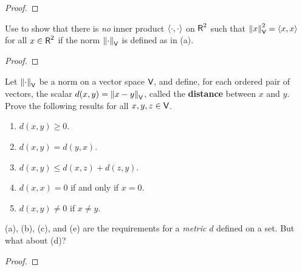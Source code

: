 \begin{proof}
\end{proof}

\begin{exercise} \label{exercise 6.1.27}
Use  to show that there is \emph{no} inner product \(\left< \cdot, \cdot \right>\) on \(\textsf{R}^2\) such that \(\left\lVert x\right\rVert_{\textsf{V}}^2 = \left< x, x \right>\) for all \(x \in \textsf{R}^2\) if the norm \(\left\lVert\cdot\right\rVert_{\textsf{V}}\) is defined as in (a).
\end{exercise}

\begin{proof}
\end{proof}

\begin{exercise} \label{exercise 6.1.28}
Let \(\left\lVert\cdot\right\rVert_{\textsf{V}}\) be a norm on a vector space \(\textsf{V}\), and define, for each ordered pair of vectors, the scalar \(d(x, y) = \left\lVert x - y\right\rVert_{\textsf{V}}\), called the \textbf{distance} between \(x\) and \(y\).
Prove the following results for all \(x, y, z \in \textsf{V}\).
\begin{enumerate}
\item \(d(x, y) \ge 0\).
\item \(d(x, y) = d(y, x)\).
\item \(d(x, y) \le d(x, z) + d(z, y)\).
\item \RED* \(d(x, x) = 0\) if and only if \(x = 0\).
\item \(d(x, y) \ne 0\) if \(x \ne y\).
\end{enumerate}
\end{exercise}

\begin{note}
(a), (b), (c), and (e) are the requirements for a \emph{metric} \(d\) defined on a set.
But what about (d)?
\end{note}

\begin{proof}
\end{proof}


